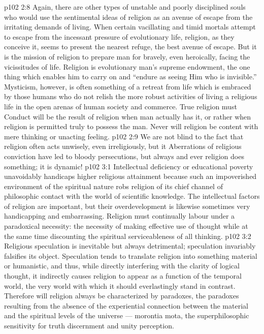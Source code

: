 \vs p102 2:8 Again, there are other types of unstable and poorly disciplined souls who would use the sentimental ideas of religion as an avenue of escape from the irritating demands of living. When certain vacillating and timid mortals attempt to escape from the incessant pressure of evolutionary life, religion, as they conceive it, seems to present the nearest refuge, the best avenue of escape. But it is the mission of religion to prepare man for bravely, even heroically, facing the vicissitudes of life. Religion is evolutionary man’s supreme endowment, the one thing which enables him to carry on and “endure as seeing Him who is invisible.” Mysticism, however, is often something of a retreat from life which is embraced by those humans who do not relish the more robust activities of living a religious life in the open arenas of human society and commerce. True religion must  Conduct will be the result of religion when man actually has it, or rather when religion is permitted truly to possess the man. Never will religion be content with mere thinking or unacting feeling.
\vs p102 2:9 We are not blind to the fact that religion often acts unwisely, even irreligiously, but it  Aberrations of religious conviction have led to bloody persecutions, but always and ever religion does something; it is dynamic!
\vs p102 3:1 Intellectual deficiency or educational poverty unavoidably handicaps higher religious attainment because such an impoverished environment of the spiritual nature robs religion of its chief channel of philosophic contact with the world of scientific knowledge. The intellectual factors of religion are important, but their overdevelopment is likewise sometimes very handicapping and embarrassing. Religion must continually labour under a paradoxical necessity: the necessity of making effective use of thought while at the same time discounting the spiritual serviceableness of all thinking.
\vs p102 3:2 Religious speculation is inevitable but always detrimental; speculation invariably falsifies its object. Speculation tends to translate religion into something material or humanistic, and thus, while directly interfering with the clarity of logical thought, it indirectly causes religion to appear as a function of the temporal world, the very world with which it should everlastingly stand in contrast. Therefore will religion always be characterized by paradoxes, the paradoxes resulting from the absence of the experiential connection between the material and the spiritual levels of the universe --- morontia mota, the superphilosophic sensitivity for truth discernment and unity perception.
